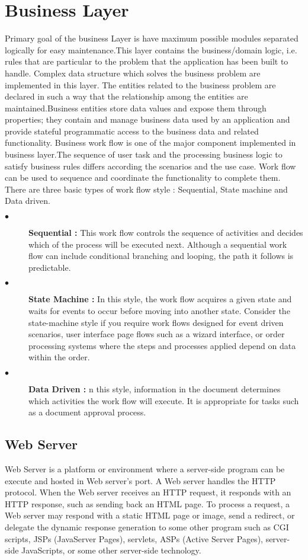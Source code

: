 \chapter{Business Layer}\label{ch:ch4label}
			
			Primary goal of the business Layer is have maximum possible modules  separated logically for easy maintenance.This layer contains the business/domain logic, i.e. rules that are particular to the problem that the application has been built to handle. Complex data structure which solves the business problem are implemented in this layer. The entities related to the business problem are declared in such a way that the relationship among the entities are maintained.Business entities store data values and expose them through properties; they contain and manage business data used by an application and provide stateful programmatic access to the business data and related functionality.   
			Business work flow is one of the major component implemented in business layer.The sequence of user task and the processing business logic to satisfy business rules differs according the scenarios and the use case. Work flow can be used to sequence and coordinate the functionality to complete them. There are three basic types of work flow style : Sequential, State machine and Data driven.
			
\begin{description}
\item[$\bullet$] {\bfseries Sequential :} This work flow controls the sequence of activities and decides which of the process will be executed next. Although a sequential work flow can include conditional branching and looping, the path it follows is predictable.
\item[$\bullet$] {\bfseries State Machine :} In this style, the work flow acquires a given state and waits for events to occur before moving into another state. Consider the state-machine style if you require work flows designed for event driven scenarios, user interface page flows such as a wizard interface, or order processing systems where the steps and processes applied depend on data within the order.
\item[$\bullet$] {\bfseries Data Driven :} n this style, information in the document determines which activities the work flow will execute. It is appropriate for tasks such as a document approval process.
\end{description}	
			 
			 
\section{Web Server}
				Web Server is a platform or environment where a server-side program can be execute and hosted in Web server's port. A Web server handles the HTTP protocol. When the Web server receives an HTTP request, it responds with an HTTP response, such as sending back an HTML page. To process a request, a Web server may respond with a static HTML page or image, send a redirect, or delegate the dynamic response generation to some other program such as CGI scripts, JSPs (JavaServer Pages), servlets, ASPs (Active Server Pages), server-side JavaScripts, or some other server-side technology.

